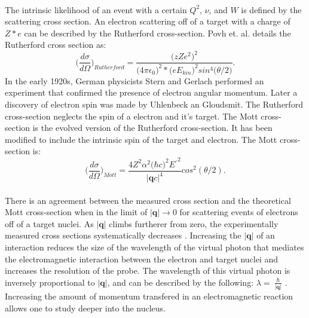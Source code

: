 \paragraph{} The intrinsic likelihood of an event with a certain $Q^2$, $\nu$, and $W$ is defined by the scattering cross section. An electron scattering off of a target with a charge of $Z*e$ can be described by the Rutherford cross-section. Povh et. al. details the Rutherford cross section as:
\begin{equation}
\bigg(\frac{d\sigma}{d\Omega}\bigg)_{Rutherford} = \frac{ \big(zZe^2\big)^2} {\big( 4\pi \epsilon_0\big)^2 * \big(e E_{kin}\big)^2 sin^4\big( \theta / 2 \big) }. 
\end{equation}
  In the early 1920s, German physicists Stern and Gerlach performed an experiment that confirmed the presence of electron angular momentum. Later a discovery of electron spin was made by Uhlenbeck an Gloudsmit.  The Rutherford cross-section neglects the spin of a electron and it's target. The Mott cross-section is the evolved version of the Rutherford cross-section. It has been modified to include the intrinsic spin of the target and electron. The Mott cross-section is: \cite{HighE,PnN}
\begin{equation}
\bigg(\frac{d\sigma}{d\Omega}\bigg)_{Mott} = \frac{4Z^2\alpha^2 \big(\hbar c \big)^2 E{^{\prime} }^2}{ |\boldsymbol{q}c|^4} cos^2 (\theta/2).
\end{equation}

\paragraph{}There is an agreement between the measured cross section and the theoretical Mott cross-section when in the limit of $|\boldsymbol{q}| \rightarrow  0$ for scattering events of electrons off of a target nuclei. As $|\boldsymbol{q}|$ climbs furtherer from zero, the experimentally measured cross sections systematically decreases \cite{PnN}. Increasing the $|\boldsymbol{q}|$ of an interaction reduces the size of the wavelength of the virtual photon that mediates the electromagnetic interaction between the electron and target nuclei and increases the resolution of the probe. The wavelength of this virtual photon is inversely proportional to $|\boldsymbol{q}|$, and can be described by the following: $\lambda = \ \frac{\hbar}{|\boldsymbol{q}|}$ \cite{PnN}. Increasing the amount of momentum transfered in an electromagnetic reaction allows one to study deeper into the nucleus. 
